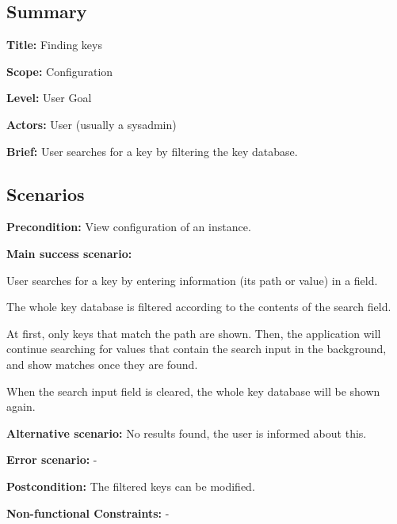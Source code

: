 \subsection*{Summary}


\begin{DoxyItemize}
\item {\bfseries Title\+:} Finding keys
\item {\bfseries Scope\+:} Configuration
\item {\bfseries Level\+:} User Goal
\item {\bfseries Actors\+:} User (usually a sysadmin)
\item {\bfseries Brief\+:} User searches for a key by filtering the key database.
\end{DoxyItemize}

\subsection*{Scenarios}


\begin{DoxyItemize}
\item {\bfseries Precondition\+:} View configuration of an instance.
\item {\bfseries Main success scenario\+:}
\begin{DoxyItemize}
\item User searches for a key by entering information (its path or value) in a field.
\item The whole key database is filtered according to the contents of the search field.
\item At first, only keys that match the path are shown. Then, the application will continue searching for values that contain the search input in the background, and show matches once they are found.
\item When the search input field is cleared, the whole key database will be shown again.
\end{DoxyItemize}
\item {\bfseries Alternative scenario\+:} No results found, the user is informed about this.
\item {\bfseries Error scenario\+:} -\/
\item {\bfseries Postcondition\+:} The filtered keys can be modified.
\item {\bfseries Non-\/functional Constraints\+:} -\/ 
\end{DoxyItemize}
